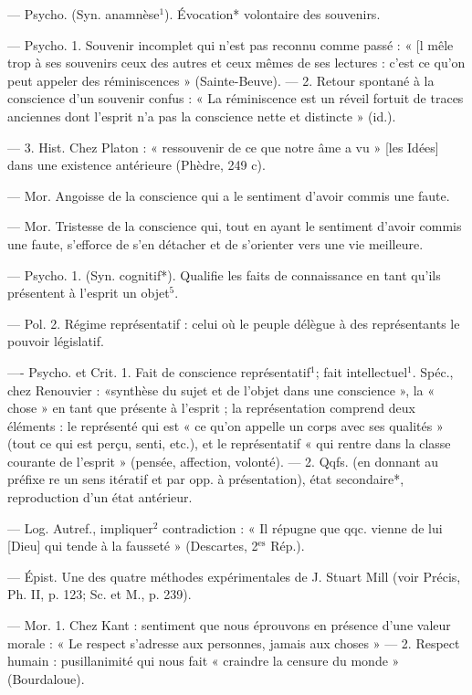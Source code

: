 \begin{itemize}[leftmargin=1cm, label=, itemsep=1pt]
 — Psycho. (Syn.
anamnèse$^1$). Évocation* volontaire
des souvenirs.

 — Psycho. 1. Souvenir
incomplet qui n’est pas reconnu
comme passé : « [l mêle trop à ses
souvenirs ceux des autres et ceux
mêmes de ses lectures : c’est ce
qu'on peut appeler des réminiscences » (Sainte-Beuve). — 2. Retour
spontané à la conscience d’un souvenir confus : « La réminiscence est
un réveil fortuit de traces anciennes
dont l'esprit n’a pas la conscience
nette et distincte » (id.).

— 3. Hist. Chez Platon : « ressouvenir de ce que notre âme a vu »
[les Idées] dans une existence antérieure (Phèdre, 249 c).

 — Mor. Angoisse de la conscience qui a le sentiment d’avoir
commis une faute.

 — Mor. Tristesse de la conscience qui, tout en ayant le sentiment d'avoir commis une faute,
s'efforce de s’en détacher et de
s'orienter vers une vie meilleure.

 — Psycho. 1. (Syn.
cognitif*). Qualifie les faits de connaissance en tant qu’ils présentent
à l'esprit un objet$^5$.

— Pol. 2. Régime représentatif :
celui où le peuple délègue à des
représentants le pouvoir législatif.

 —- Psycho. et Crit.
1. Fait de conscience représentatif$^1$;
fait intellectuel$^1$. Spéc., chez Renouvier : «synthèse du sujet et de l’objet
dans une conscience », la « chose »
en tant que présente à l'esprit ; la
représentation comprend deux éléments : le représenté qui est « ce
qu’on appelle un corps avec ses qualités » (tout ce qui est perçu, senti,
etc.), et le représentatif « qui rentre
dans la classe courante de l'esprit »
(pensée, affection, volonté). — 2.
Qqfs. (en donnant au préfixe re un
sens itératif et par opp. à présentation), état secondaire*, reproduction d’un état antérieur.

 — Log. Autref., impliquer$^2$
contradiction : « Il répugne que
qqc. vienne de lui [Dieu] qui tende
à la fausseté » (Descartes, 2$^\text{es}$ Rép.).

 — Épist. Une
des quatre méthodes expérimentales de J. Stuart Mill (voir Précis,
Ph. II, p. 123; Sc. et M., p. 239).

 — Mor. 1. Chez Kant : sentiment que nous éprouvons en présence d’une valeur morale : « Le
respect s’adresse aux personnes, jamais aux choses » — 2. Respect
humain : pusillanimité qui nous fait
« craindre la censure du monde »
(Bourdaloue).


\end{itemize}
